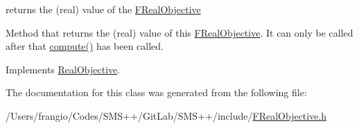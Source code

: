 returns the (real) value of the \mbox{\hyperlink{class_s_m_spp__di__unipi__it_1_1_f_real_objective}{F\+Real\+Objective}} 

Method that returns the (real) value of this \mbox{\hyperlink{class_s_m_spp__di__unipi__it_1_1_f_real_objective}{F\+Real\+Objective}}. It can only be called after that \mbox{\hyperlink{class_s_m_spp__di__unipi__it_1_1_f_real_objective_afc8ff54ab05d22f4cca0fb0bfbeb7a49}{compute()}} has been called. 

Implements \mbox{\hyperlink{class_s_m_spp__di__unipi__it_1_1_real_objective_a0f22975a7eb12dac66b8c31ec72ac13e}{Real\+Objective}}.



The documentation for this class was generated from the following file\+:\begin{DoxyCompactItemize}
\item 
/\+Users/frangio/\+Codes/\+S\+M\+S++/\+Git\+Lab/\+S\+M\+S++/include/\mbox{\hyperlink{_f_real_objective_8h}{F\+Real\+Objective.\+h}}\end{DoxyCompactItemize}
